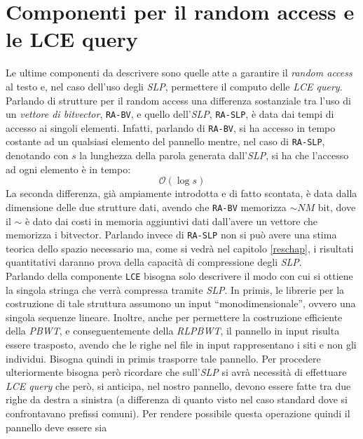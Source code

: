 \section{Componenti per il random access e le LCE query}
Le ultime componenti da descrivere sono quelle atte a garantire il
\textit{random access} 
al testo e, nel caso dell'uso degli \textit{SLP}, permettere il computo delle
\textit{LCE query}.\\
Parlando di strutture per il random access una differenza sostanziale tra
l'uso di un \textit{vettore di bitvector}, \texttt{RA-BV}, e quello
dell'\textit{SLP}, \texttt{RA-SLP}, è data dai tempi di accesso ai singoli
elementi. Infatti, parlando di \texttt{RA-BV}, si ha accesso in tempo costante
ad un qualsiasi elemento del pannello mentre, nel caso di \texttt{RA-SLP},
denotando con $s$ la lunghezza della parola generata dall'\textit{SLP}, si ha
che l'accesso ad ogni elemento è in tempo:
\begin{equation}
  \label{eq:timera}
  \mathcal{O}(\log s)
\end{equation}
La seconda differenza, già ampiamente introdotta e di fatto scontata, è data
dalla dimensione delle due strutture dati, avendo che \texttt{RA-BV} memorizza
$\sim NM$ bit, dove il $\sim$ è dato dai costi in memoria aggiuntivi dati
dall'avere un vettore che memorizza i bitvector. Parlando invece di
\texttt{RA-SLP} non si può avere una stima teorica dello spazio necessario ma,
come si vedrà nel capitolo \ref{reschap}, i risultati quantitativi daranno prova
della capacità di compressione degli \textit{SLP}.\\
Parlando della componente \texttt{LCE} bisogna solo descrivere il modo con cui
si ottiene la singola stringa che verrà compressa tramite \textit{SLP}.
In primis, le
librerie per la costruzione di tale struttura assumono un input
``monodimensionale'', ovvero una singola sequenze lineare. Inoltre, anche per
permettere la costruzione efficiente della \textit{PBWT}, e conseguentemente
della \textit{RLPBWT}, il pannello in input risulta essere trasposto, avendo che
le righe nel file in input rappresentano i siti e non gli individui. Bisogna
quindi in primis trasporre tale pannello. Per procedere ulteriormente bisogna
però ricordare che sull'\textit{SLP} si avrà 
necessità di effettuare \textit{LCE query} che però, si anticipa, nel nostro
pannello, devono essere fatte tra due righe da destra a sinistra (a differenza
di quanto visto nel caso standard dove si confrontavano prefissi comuni). Per
rendere possibile questa operazione quindi il pannello deve essere sia 
